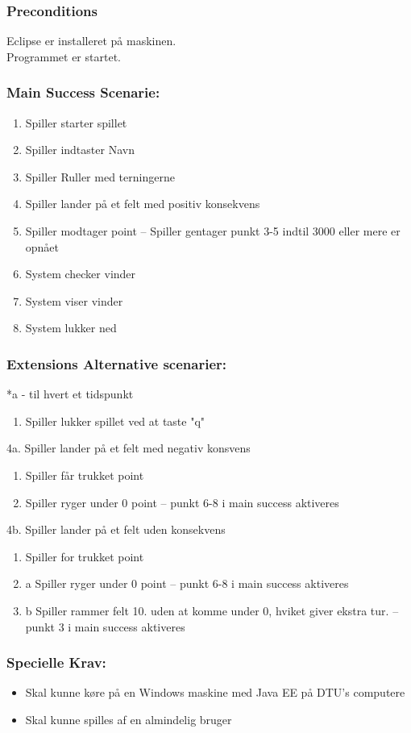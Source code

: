 \subsubsection*{Preconditions}
Eclipse er installeret på maskinen.
\\
Programmet er startet.
\subsubsection*{Main Success Scenarie:}
\begin{enumerate}
\item Spiller starter spillet
\item Spiller indtaster Navn
\item Spiller Ruller med terningerne
\item Spiller lander på et felt med positiv konsekvens
\item Spiller modtager point
-- Spiller gentager punkt 3-5 indtil 3000 eller mere er opnået
\item System checker vinder
\item System viser vinder
\item System lukker ned
\end{enumerate}
\subsubsection*{Extensions Alternative scenarier:}
*a - til hvert et tidspunkt
\begin{enumerate}
\item Spiller lukker spillet ved at taste "q"
\end{enumerate}
4a. Spiller lander på et felt med negativ konsvens
\begin{enumerate}
\item Spiller får trukket point
\item Spiller ryger under 0 point
-- punkt 6-8 i main success aktiveres
\end{enumerate}
4b. Spiller lander på et felt uden konsekvens
\begin{enumerate}
\item Spiller for trukket point
\item a Spiller ryger under 0 point
-- punkt 6-8 i main success aktiveres
\item b Spiller rammer felt 10. uden at komme under 0, hviket giver ekstra tur. 
-- punkt 3 i main success aktiveres
\end{enumerate}
\subsubsection*{Specielle Krav:}
\begin{itemize}
\item Skal kunne køre på en Windows maskine med Java EE på DTU's computere
\item Skal kunne spilles af en almindelig bruger
\end{itemize}
